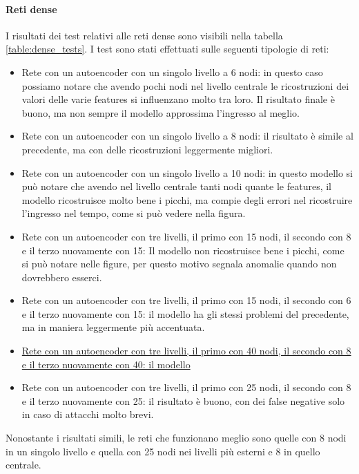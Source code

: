 \paragraph{Reti dense} I risultati dei test relativi alle reti dense sono visibili nella tabella \ref{table:dense_tests}.
I test sono stati effettuati sulle seguenti tipologie di reti:
\begin{itemize}
    \item Rete con un autoencoder con un singolo livello a 6 nodi: in questo caso possiamo notare che avendo pochi nodi nel livello centrale le ricostruzioni dei valori delle varie features si influenzano molto tra loro. Il risultato finale è buono, ma non sempre il modello approssima l'ingresso al meglio.
    \item Rete con un autoencoder con un singolo livello a 8 nodi: il risultato è simile al precedente, ma con delle ricostruzioni leggermente migliori.
    \item Rete con un autoencoder con un singolo livello a 10 nodi: in questo modello si può notare che avendo nel livello centrale tanti nodi quante le features, il modello ricostruisce molto bene i picchi, ma compie degli errori nel ricostruire l'ingresso nel tempo, come si può vedere nella figura.
    \item Rete con un autoencoder con tre livelli, il primo con 15 nodi, il secondo con 8 e il terzo nuovamente con 15: Il modello non ricostruisce bene i picchi, come si può notare nelle figure, per questo motivo segnala anomalie quando non dovrebbero esserci.
    \item Rete con un autoencoder con tre livelli, il primo con 15 nodi, il secondo con 6 e il terzo nuovamente con 15: il modello ha gli stessi problemi del precedente, ma in maniera leggermente più accentuata.
    \item \uline{Rete con un autoencoder con tre livelli, il primo con 40 nodi, il secondo con 8 e il terzo nuovamente con 40: il modello}  %
    \item Rete con un autoencoder con tre livelli, il primo con 25 nodi, il secondo con 8 e il terzo nuovamente con 25: il risultato è buono, con dei false negative solo in caso di attacchi molto brevi.

\end{itemize}

Nonostante i risultati simili, le reti che funzionano meglio sono quelle con 8 nodi in un singolo livello e quella con 25 nodi nei livelli più esterni e 8 in quello centrale.

